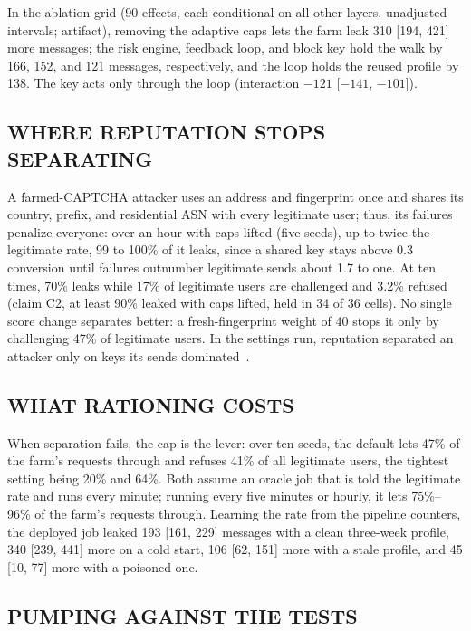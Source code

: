 \documentclass{IEEEoj}
\begin{document}
In the ablation grid (90 effects, each conditional on all other layers, unadjusted intervals; artifact), removing the adaptive caps lets the farm leak 310 [194, 421] more messages; the risk engine, feedback loop, and block key hold the walk by 166, 152, and 121 messages, respectively, and the loop holds the reused profile by 138. The key acts only through the loop (interaction $-121$ [$-141$, $-101$]).

\subsection{WHERE REPUTATION STOPS SEPARATING}
\label{sec:separability}

A farmed-CAPTCHA attacker uses an address and fingerprint once and shares its country, prefix, and residential ASN with every legitimate user; thus, its failures penalize everyone: over an hour with caps lifted (five seeds), up to twice the legitimate rate, 99 to 100\% of it leaks, since a shared key stays above 0.3 conversion until failures outnumber legitimate sends about 1.7 to one. At ten times, 70\% leaks while 17\% of legitimate users are challenged and 3.2\% refused (claim C2, at least 90\% leaked with caps lifted, held in 34 of 36 cells). No single score change separates better: a fresh-fingerprint weight of 40 stops it only by challenging 47\% of legitimate users. In the settings run, reputation separated an attacker only on keys its sends dominated~\cite{douceur2002sybil}.

\subsection{WHAT RATIONING COSTS}
\label{sec:rationing}

When separation fails, the cap is the lever: over ten seeds, the default lets 47\% of the farm's requests through and refuses 41\% of all legitimate users, the tightest setting being 20\% and 64\%. Both assume an oracle job that is told the legitimate rate and runs every minute; running every five minutes or hourly, it lets 75\%--96\% of the farm's requests through. Learning the rate from the pipeline counters, the deployed job leaked 193 [161, 229] messages with a clean three-week profile, 340 [239, 441] more on a cold start, 106 [62, 151] more with a stale profile, and 45 [10, 77] more with a poisoned one.




\subsection{PUMPING AGAINST THE TESTS}
\label{sec:pumping}
\end{document}
